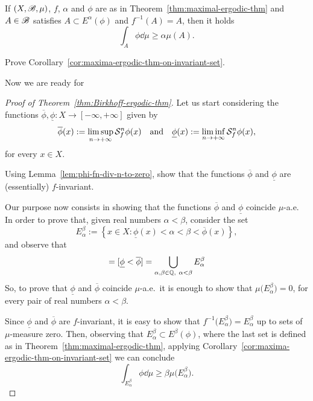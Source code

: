 \begin{corollary}\label{cor:maxima-ergodic-thm-on-invariant-set}
  If $(X,\mathscr{B},\mu)$, $f$, $\alpha$ and $\phi$ are as in Theorem~\ref{thm:maximal-ergodic-thm} and $A\in\mathscr{B}$ satisfies $A\subset E^{\alpha}(\phi)$ and $f^{-1}(A)=A$, then it holds
  \begin{displaymath}
    \int_{A}\phi\dd\mu \geq \alpha\mu(A).
  \end{displaymath}
\end{corollary}

\begin{exercise}
  Prove Corollary~\ref{cor:maxima-ergodic-thm-on-invariant-set}.
\end{exercise}

Now we are ready for
\begin{proof}[Proof of Theorem~\ref{thm:Birkhoff-ergodic-thm}]
  Let us start considering the functions $\overline{\phi},\underline{\phi}\colon X\to[-\infty,+\infty]$ given by
  \begin{displaymath}
    \overline{\phi}(x):=\limsup_{n\to+\infty}\mathcal{S}_f^n\phi(x) \quad\text{and}\quad \underline{\phi}(x):=\liminf_{n\to+\infty} \mathcal{S}_f^n\phi(x),
  \end{displaymath}
  for every $x\in X$.

  \begin{exercise}
    Using Lemma~\ref{lem:phi-fn-div-n-to-zero}, show that the functions $\overline\phi$ and $\underline{\phi}$ are (essentially) $f$-invariant.
  \end{exercise}

  Our purpose now consists in showing that the functions $\overline{\phi}$ and $\underline{\phi}$ coincide $\mu$-a.e. In order to prove that, given real numbers $\alpha<\beta$, consider the set
  \begin{displaymath}
    E_\alpha^\beta:=\left\{x\in X : \underline{\phi}(x)<\alpha<\beta<\overline{\phi}(x)\right\},
  \end{displaymath}
  and observe that
  \begin{displaymath}
    [\underline{\phi}\neq \overline{\phi}] = [\underline{\phi}<\overline{\phi}] = \bigcup_{\alpha,\beta\in\Q,\ \alpha<\beta} E_{\alpha}^{\beta}
  \end{displaymath}
  So, to prove that $\underline{\phi}$ and $\overline{\phi}$ coincide $\mu$-a.e.~it is enough to show that $\mu\big(E_\alpha^\beta\big)=0$, for every pair of real numbers $\alpha<\beta$.

  Since $\underline{\phi}$ and $\overline{\phi}$ are $f$-invariant, it is easy to show that $f^{-1}\Big(E_\alpha^\beta\Big)=E_\alpha^\beta$ up to sets of $\mu$-measure zero. Then, observing that $E_\alpha^\beta\subset E^\beta(\phi)$, where the last set is defined as in Theorem~\ref{thm:maximal-ergodic-thm}, applying Corollary~\ref{cor:maxima-ergodic-thm-on-invariant-set} we can conclude
  \begin{displaymath}
    \int_{E_\alpha^\beta}\phi\dd\mu\geq\beta\mu\Big(E_\alpha^\beta\Big).
  \end{displaymath}



\end{proof}
